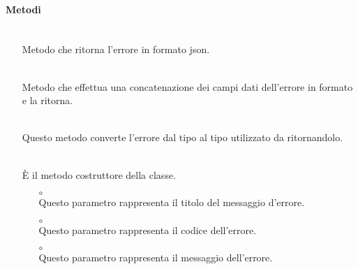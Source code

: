 \paragraph*{Metodi}
\begin{itemize}
\item[]  \\ Metodo che ritorna l'errore in formato json.
\item[]  \\ Metodo che effettua una concatenazione dei campi dati dell'errore in formato  e la ritorna.
\item[]  \\ Questo metodo converte l'errore dal tipo  al tipo  utilizzato da  ritornandolo.
\item[]  \\ È il metodo costruttore della classe.
\begin{itemize}\addtolength{\itemsep}{-0.5\baselineskip}
\item[$\circ$]  \\ Questo parametro rappresenta il titolo del messaggio d'errore.
\item[$\circ$]  \\ Questo parametro rappresenta il codice dell'errore.
\item[$\circ$]  \\ Questo parametro rappresenta il messaggio dell'errore.
\end{itemize}
\end{itemize}
